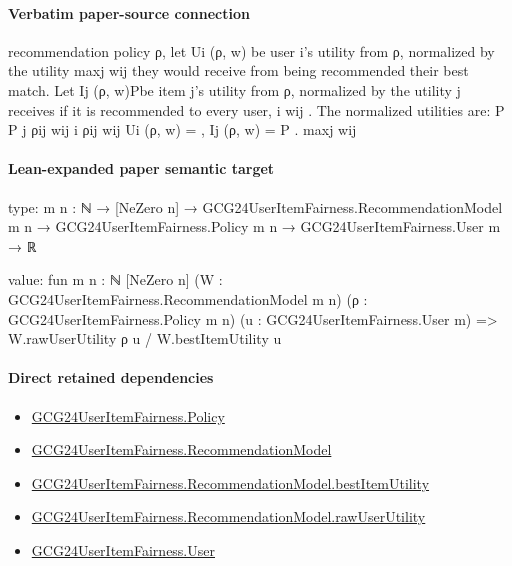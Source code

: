 \documentclass[10pt]{article}
\begin{document}
\paragraph{Verbatim paper-source connection}
\begin{ReviewVerbatim}
recommendation policy ρ, let Ui (ρ, w) be user i’s utility from ρ, normalized by the utility maxj wij
they would receive from being recommended their best match. Let Ij (ρ, w)Pbe item j’s utility from
ρ, normalized by the utility j receives if it is recommended to every user, i wij . The normalized
utilities are:
P
P
j ρij wij
i ρij wij
Ui (ρ, w) =
, Ij (ρ, w) = P
.
maxj wij
\end{ReviewVerbatim}



\paragraph{Lean-expanded paper semantic target}
\begin{ReviewVerbatim}
type:
{m n : ℕ} →
  [NeZero n] →
    GCG24UserItemFairness.RecommendationModel m n → GCG24UserItemFairness.Policy m n → GCG24UserItemFairness.User m → ℝ

value:
fun {m n : ℕ} [NeZero n] (W : GCG24UserItemFairness.RecommendationModel m n) (ρ : GCG24UserItemFairness.Policy m n)
    (u : GCG24UserItemFairness.User m) =>
  W.rawUserUtility ρ u / W.bestItemUtility u
\end{ReviewVerbatim}

\paragraph{Direct retained dependencies}
\begin{itemize}\raggedright
\item \hyperlink{governing-declaration-34ca6b905b48428a}{GCG24\allowbreak{}User\allowbreak{}Item\allowbreak{}Fairness.\allowbreak{}Policy}
\item \hyperlink{governing-declaration-4b845f20f80fb146}{GCG24\allowbreak{}User\allowbreak{}Item\allowbreak{}Fairness.\allowbreak{}Recommendation\allowbreak{}Model}
\item \hyperlink{governing-declaration-37492be7beed6ce0}{GCG24\allowbreak{}User\allowbreak{}Item\allowbreak{}Fairness.\allowbreak{}Recommendation\allowbreak{}Model.\allowbreak{}best\allowbreak{}Item\allowbreak{}Utility}
\item \hyperlink{paper-prerequisite-4c12034215b920ef}{GCG24\allowbreak{}User\allowbreak{}Item\allowbreak{}Fairness.\allowbreak{}Recommendation\allowbreak{}Model.\allowbreak{}raw\allowbreak{}User\allowbreak{}Utility}
\item \hyperlink{governing-declaration-800dd691bc989470}{GCG24\allowbreak{}User\allowbreak{}Item\allowbreak{}Fairness.\allowbreak{}User}
\end{itemize}
\end{document}
